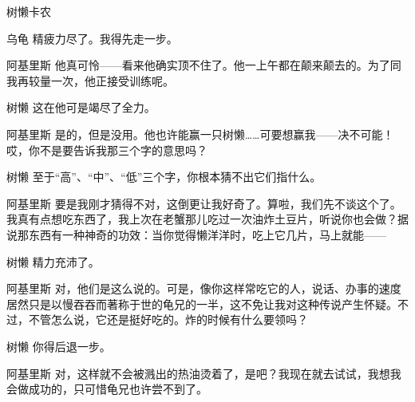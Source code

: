 \begin{dialog}{树懒卡农}
\begin{dialogue}
\item[乌龟]精疲力尽了。我得先走一步。

\item[阿基里斯]他真可怜——看来他确实顶不住了。他一上午都在颠来颠去的。为了同我再较量一次，他正接受训练呢。

\item[树懒]这在他可是竭尽了全力。

\item[阿基里斯]是的，但是没用。他也许能赢一只树懒……可要想赢我——决不可能！哎，你不是要告诉我那三个字的意思吗？

\item[树懒]至于“高”、“中”、“低”三个字，你根本猜不出它们指什么。

\item[阿基里斯]要是我刚才猜得不对，这倒更让我好奇了。算啦，我们先不谈这个了。我真有点想吃东西了，我上次在老蟹那儿吃过一次油炸土豆片，听说你也会做？据说那东西有一种神奇的功效：当你觉得懒洋洋时，吃上它几片，马上就能——

\item[树懒]精力充沛了。

\item[阿基里斯]对，他们是这么说的。可是，像你这样常吃它的人，说话、办事的速度居然只是以慢吞吞而著称于世的龟兄的一半，这不免让我对这种传说产生怀疑。不过，不管怎么说，它还是挺好吃的。炸的时候有什么要领吗？

\item[树懒]你得后退一步。

\item[阿基里斯]对，这样就不会被溅出的热油烫着了，是吧？我现在就去试试，我想我会做成功的，只可惜龟兄也许尝不到了。

\end{dialogue}

\end{dialog}
